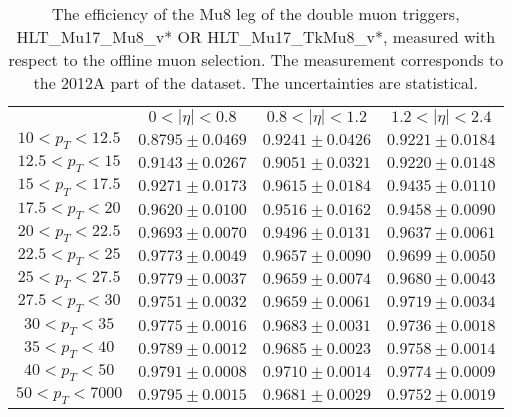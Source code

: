 \begin{table}[!ht]
\begin{center}
\begin{tabular}{c|c|c|c}
\hline & $0 < |\eta| < 0.8$ & $0.8 < |\eta| < 1.2$ & $1.2 < |\eta| < 2.4$  \\
$ 10 < p_T < 12.5$ & $0.8795 \pm 0.0469$ & $0.9241 \pm 0.0426$ & $0.9221 \pm 0.0184$  \\
$12.5 < p_T <  15$ & $0.9143 \pm 0.0267$ & $0.9051 \pm 0.0321$ & $0.9220 \pm 0.0148$  \\
$ 15 < p_T < 17.5$ & $0.9271 \pm 0.0173$ & $0.9615 \pm 0.0184$ & $0.9435 \pm 0.0110$  \\
$17.5 < p_T <  20$ & $0.9620 \pm 0.0100$ & $0.9516 \pm 0.0162$ & $0.9458 \pm 0.0090$  \\
$ 20 < p_T < 22.5$ & $0.9693 \pm 0.0070$ & $0.9496 \pm 0.0131$ & $0.9637 \pm 0.0061$  \\
$22.5 < p_T <  25$ & $0.9773 \pm 0.0049$ & $0.9657 \pm 0.0090$ & $0.9699 \pm 0.0050$  \\
$ 25 < p_T < 27.5$ & $0.9779 \pm 0.0037$ & $0.9659 \pm 0.0074$ & $0.9680 \pm 0.0043$  \\
$27.5 < p_T <  30$ & $0.9751 \pm 0.0032$ & $0.9659 \pm 0.0061$ & $0.9719 \pm 0.0034$  \\
$ 30 < p_T <  35$ & $0.9775 \pm 0.0016$ & $0.9683 \pm 0.0031$ & $0.9736 \pm 0.0018$  \\
$ 35 < p_T <  40$ & $0.9789 \pm 0.0012$ & $0.9685 \pm 0.0023$ & $0.9758 \pm 0.0014$  \\
$ 40 < p_T <  50$ & $0.9791 \pm 0.0008$ & $0.9710 \pm 0.0014$ & $0.9774 \pm 0.0009$  \\
$ 50 < p_T < 7000$ & $0.9795 \pm 0.0015$ & $0.9681 \pm 0.0029$ & $0.9752 \pm 0.0019$  \\
\hline
\hline
\end{tabular}
\caption{The efficiency of the Mu8 leg of the double muon triggers,
HLT\_Mu17\_Mu8\_v* OR HLT\_Mu17\_TkMu8\_v*,
measured with respect to the offline muon selection. 
The measurement corresponds to the 2012A part of the dataset.
The uncertainties are statistical.}
\label{tab:eff_muon_trail_dbl}
\end{center}
\end{table}


